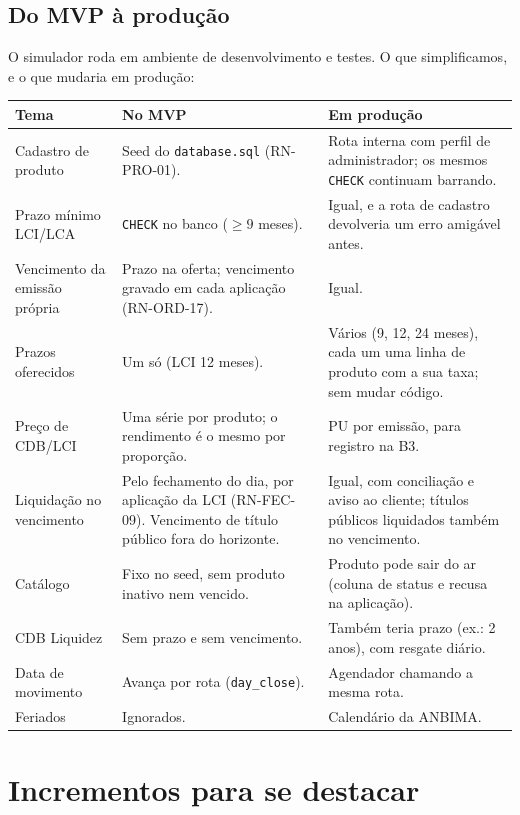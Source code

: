 \documentclass[11pt,a4paper]{article}
\newcommand{\tb}[1]{\texttt{#1}}           %
\begin{document}
\subsection{Do MVP à produção}

O simulador roda em ambiente de desenvolvimento e testes. O que simplificamos, e o que mudaria em
produção:

\begingroup\small
\begin{longtable}{@{}P{3.4cm}P{6.1cm}P{6.5cm}@{}}
\toprule
\textbf{Tema} & \textbf{No MVP} & \textbf{Em produção} \\
\midrule
\endhead
Cadastro de produto & Seed do \tb{database.sql} (RN-PRO-01). & Rota interna com perfil de administrador; os mesmos \tb{CHECK} continuam barrando. \\
Prazo mínimo LCI/LCA & \tb{CHECK} no banco ($\ge 9$ meses). & Igual, e a rota de cadastro devolveria um erro amigável antes. \\
Vencimento da emissão própria & Prazo na oferta; vencimento gravado em cada aplicação (RN-ORD-17). & Igual. \\
Prazos oferecidos & Um só (LCI 12 meses). & Vários (9, 12, 24 meses), cada um uma linha de produto com a sua taxa; sem mudar código. \\
Preço de CDB/LCI & Uma série por produto; o rendimento é o mesmo por proporção. & PU por emissão, para registro na B3. \\
Liquidação no vencimento & Pelo fechamento do dia, por aplicação da LCI (RN-FEC-09). Vencimento de título público fora do horizonte. & Igual, com conciliação e aviso ao cliente; títulos públicos liquidados também no vencimento. \\
Catálogo & Fixo no seed, sem produto inativo nem vencido. & Produto pode sair do ar (coluna de status e recusa na aplicação). \\
CDB Liquidez & Sem prazo e sem vencimento. & Também teria prazo (ex.: 2 anos), com resgate diário. \\
Data de movimento & Avança por rota (\tb{day_close}). & Agendador chamando a mesma rota. \\
Feriados & Ignorados. & Calendário da ANBIMA. \\
\bottomrule
\end{longtable}
\endgroup

\section{Incrementos para se destacar}\label{sec:incrementos}
\end{document}
